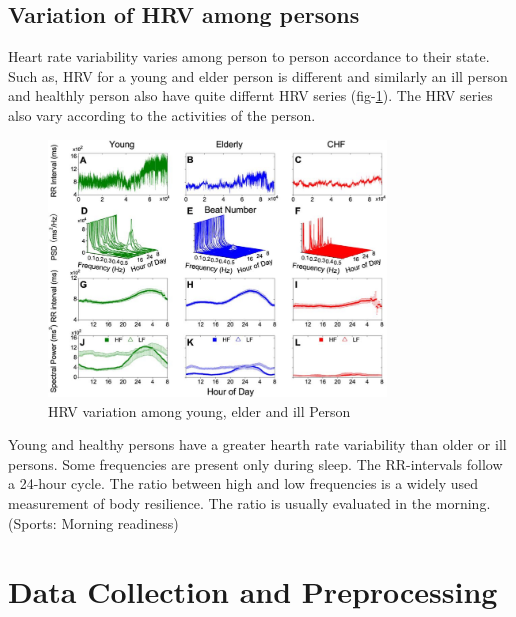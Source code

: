 \documentclass[a4paper, 11pt]{report}\usepackage[]{graphicx}\usepackage[]{color}
\numberwithin{figure}{section}
\begin{document}
\section{Variation of HRV among persons}
Heart rate variability varies among person to person accordance to their state. Such as, HRV for a young and elder person is different and similarly an ill person and healthly person also have quite differnt HRV series (fig-\ref{fig:hrv.variation}). The HRV series also vary according to the activities of the person.
\begin{figure}[H]
\centering
\includegraphics[width = 0.8\textwidth]{figure/hrvVariation}
\caption{HRV variation among young, elder and ill Person}
\label{fig:hrv.variation}
\end{figure}

Young and healthy persons have a greater hearth rate variability than older or ill persons. Some frequencies are present only during sleep. The RR-intervals follow a 24-hour cycle. The ratio between high and low frequencies is a widely used measurement of body resilience. The ratio is usually evaluated in the morning. (Sports: Morning readiness)

\chapter{Data Collection and Preprocessing}



\end{document}
